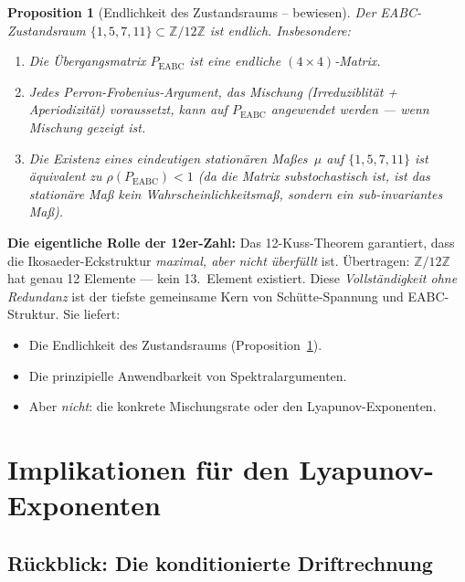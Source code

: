\documentclass[12pt,a4paper]{article}
\newtheorem{proposition}[definition]{Proposition}
\newcommand{\Z}{\mathbb{Z}}
\newcommand{\ZmZ}{\Z/12\Z}
\begin{document}
\begin{proposition}[Endlichkeit des Zustandsraums -- bewiesen]
\label{prop:endlich}
Der EABC-Zustandsraum $\{1, 5, 7, 11\} \subset \ZmZ$ ist endlich.
Insbesondere:
\begin{enumerate}[noitemsep]
  \item Die Übergangsmatrix $P_{\text{EABC}}$ ist eine endliche $(4\times 4)$-Matrix.
  \item Jedes Perron-Frobenius-Argument, das Mischung (Irreduziblität +
        Aperiodizität) voraussetzt, kann auf $P_{\text{EABC}}$ angewendet
        werden --- \emph{wenn} Mischung gezeigt ist.
  \item Die Existenz eines eindeutigen stationären Maßes~$\mu$ auf
        $\{1,5,7,11\}$ ist äquivalent zu $\rho(P_{\text{EABC}}) < 1$
        (da die Matrix substochastisch ist, ist das stationäre Maß kein
        Wahrscheinlichkeitsmaß, sondern ein sub-invariantes Maß).
\end{enumerate}
\end{proposition}

\begin{tcolorbox}[kernidee]
\textbf{Die eigentliche Rolle der 12er-Zahl:}
Das 12-Kuss-Theorem garantiert, dass die Ikosaeder-Eckstruktur
\emph{maximal, aber nicht überfüllt} ist.
Übertragen: $\ZmZ$ hat genau 12 Elemente --- kein 13.\ Element existiert.
Diese \emph{Vollständigkeit ohne Redundanz} ist der tiefste gemeinsame Kern
von Schütte-Spannung und EABC-Struktur.
Sie liefert:
\begin{itemize}[noitemsep]
  \item Die Endlichkeit des Zustandsraums (Proposition~\ref{prop:endlich}).
  \item Die prinzipielle Anwendbarkeit von Spektralargumenten.
  \item Aber \emph{nicht}: die konkrete Mischungsrate oder den
        Lyapunov-Exponenten.
\end{itemize}
\end{tcolorbox}

\section{Implikationen für den Lyapunov-Exponenten}
\label{sec:lyapunov}

\subsection{Rückblick: Die konditionierte Driftrechnung}
\end{document}
